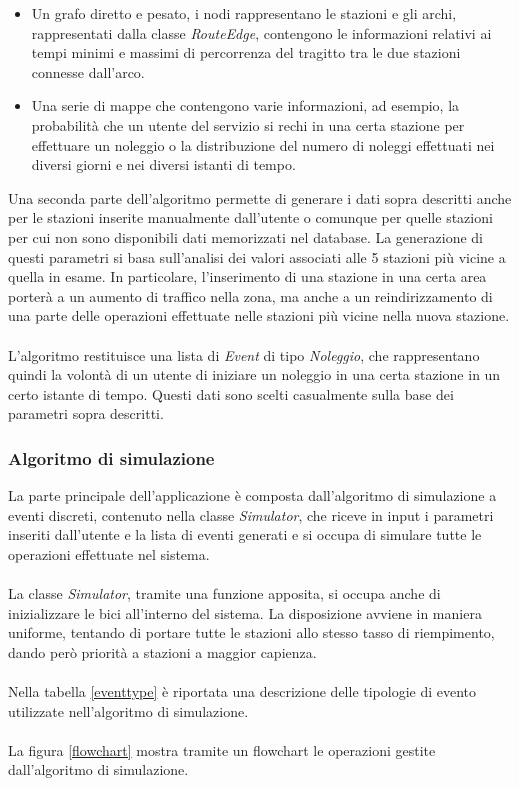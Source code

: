 \documentclass[a4paper, 12pt]{article}
\begin{document}
	\begin{itemize}
		\item Un grafo diretto e pesato, i nodi rappresentano le stazioni e gli archi, rappresentati dalla classe \textit{RouteEdge}, contengono le informazioni relativi ai tempi minimi e massimi di percorrenza del tragitto tra le due stazioni connesse dall'arco.
		\item Una serie di mappe che contengono varie informazioni, ad esempio, la probabilità che un utente del servizio si rechi in una certa stazione per effettuare un noleggio o la distribuzione del numero di noleggi effettuati nei diversi giorni e nei diversi istanti di tempo.\\
	\end{itemize}
Una seconda parte dell'algoritmo permette di generare i dati sopra descritti anche per le stazioni inserite manualmente dall'utente o comunque per quelle stazioni per cui non sono disponibili dati memorizzati nel database. La generazione di questi parametri si basa sull'analisi dei valori associati alle 5 stazioni più vicine a quella in esame.
In particolare, l'inserimento di una stazione in una certa area porterà a un aumento di traffico nella zona, ma anche a un reindirizzamento di una parte delle operazioni effettuate nelle stazioni più vicine nella nuova stazione.\\\\
L'algoritmo restituisce una lista di \textit{Event} di tipo \textit{Noleggio}, che rappresentano quindi la volontà di un utente di iniziare un noleggio in una certa stazione in un certo istante di tempo. Questi dati sono scelti casualmente sulla base dei parametri sopra descritti.


		\subsubsection{Algoritmo di simulazione}

		La parte principale dell'applicazione è composta dall'algoritmo di simulazione a eventi discreti, contenuto nella classe \textit{Simulator}, che riceve in input i parametri inseriti dall'utente e la lista di eventi generati e si occupa di simulare tutte le operazioni effettuate nel sistema.\\\\
		La classe \textit{Simulator}, tramite una funzione apposita, si occupa anche di inizializzare le bici all'interno del sistema. La disposizione avviene in maniera uniforme, tentando di portare tutte le stazioni allo stesso tasso di riempimento, dando però priorità a stazioni a maggior capienza.\\\\
Nella tabella \ref{eventtype} è riportata una descrizione delle tipologie di evento utilizzate nell'algoritmo di simulazione.\\\\
La figura \ref{flowchart} mostra tramite un flowchart le operazioni gestite dall'algoritmo di simulazione.
\end{document}
